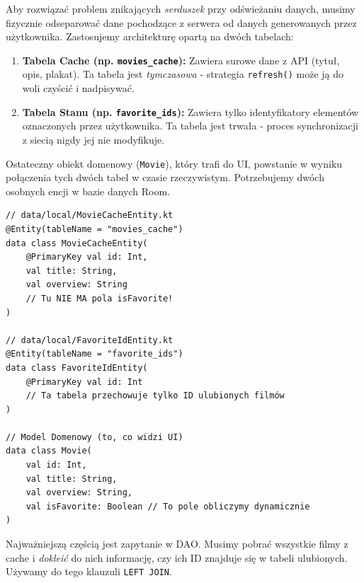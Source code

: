 Aby rozwiązać problem znikających \textit{serduszek} przy odświeżaniu danych, musimy fizycznie odseparować dane pochodzące z serwera od danych generowanych przez użytkownika. Zastosujemy architekturę opartą na dwóch tabelach:
\begin{enumerate}
    \item \textbf{Tabela Cache (np. \texttt{movies\_cache}):} Zawiera surowe dane z API (tytuł, opis, plakat). Ta tabela jest \textit{tymczasowa} - strategia \texttt{refresh()} może ją do woli czyścić i nadpisywać.
    \item \textbf{Tabela Stanu (np. \texttt{favorite\_ids}):} Zawiera tylko identyfikatory elementów oznaczonych przez użytkownika. Ta tabela jest trwała - proces synchronizacji z siecią nigdy jej nie modyfikuje.
\end{enumerate}

Ostateczny obiekt domenowy (\texttt{Movie}), który trafi do UI, powstanie w wyniku połączenia tych dwóch tabel w czasie rzeczywistym. Potrzebujemy dwóch osobnych encji w bazie danych Room.

\begin{verbatim}
// data/local/MovieCacheEntity.kt
@Entity(tableName = "movies_cache")
data class MovieCacheEntity(
    @PrimaryKey val id: Int,
    val title: String,
    val overview: String
    // Tu NIE MA pola isFavorite!
)

// data/local/FavoriteIdEntity.kt
@Entity(tableName = "favorite_ids")
data class FavoriteIdEntity(
    @PrimaryKey val id: Int
    // Ta tabela przechowuje tylko ID ulubionych filmów
)

// Model Domenowy (to, co widzi UI)
data class Movie(
    val id: Int,
    val title: String,
    val overview: String,
    val isFavorite: Boolean // To pole obliczymy dynamicznie
)
\end{verbatim}

Najważniejszą częścią jest zapytanie w DAO. Musimy pobrać wszystkie filmy z cache i \textit{dokleić} do nich informację, czy ich ID znajduje się w tabeli ulubionych. Używamy do tego klauzuli \texttt{LEFT JOIN}.

